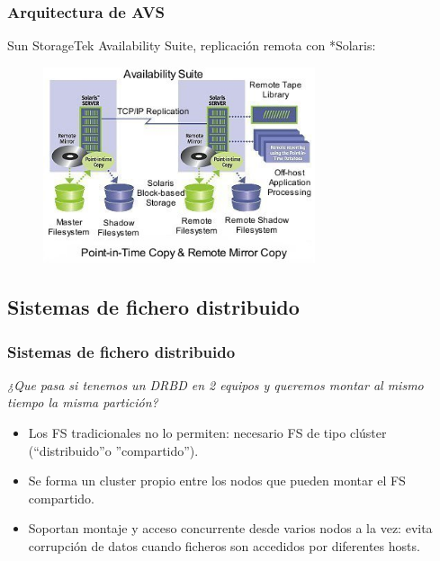 \documentclass{beamer}
\begin{document}
\begin{frame}
  \frametitle{Arquitectura de AVS}

Sun StorageTek Availability Suite, replicación remota con *Solaris:

\begin{figure}[h]
\begin{center}
  \includegraphics[width=8cm]{figs/availabilitysuitenew.jpg}
\end{center}
\end{figure}

\end{frame}

\subsection{Sistemas de fichero distribuido}
\begin{frame}
  \frametitle{Sistemas de fichero distribuido}

\textit{¿Que pasa si tenemos un DRBD en 2 equipos y queremos montar al mismo tiempo la misma partición?}

  \begin{itemize}
    \item Los FS tradicionales no lo permiten: necesario FS de tipo clúster (``distribuido''o ''compartido'').
    \item Se forma un cluster propio entre los nodos que pueden montar el FS compartido.
    \item Soportan montaje y acceso concurrente desde varios nodos a la vez: evita corrupción de datos cuando ficheros son accedidos por diferentes hosts.
  \end{itemize}
\end{frame}
\end{document}
